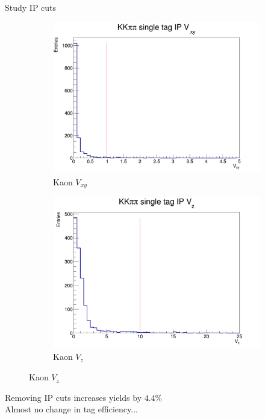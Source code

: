 \documentclass{beamer}
\begin{document}
\begin{frame}{Study IP cuts}
  \begin{figure}
    \centering
    \begin{subfigure}{0.49\textwidth}
      \centering
      \includegraphics[width=\textwidth]{Plots/KaonIP_Vxy.png}
      \caption{Kaon $V_{xy}$}
    \end{subfigure}%
    \begin{subfigure}{0.49\textwidth}
      \centering
      \includegraphics[width=\textwidth]{Plots/KaonIP_Vz.png}
      \caption{Kaon $V_z$}
    \end{subfigure}
  \end{figure}
  \begin{center}
    Removing IP cuts increases yields by $4.4\%$ \\
    Almost no change in tag efficiency...
  \end{center}
\end{frame}
\end{document}
